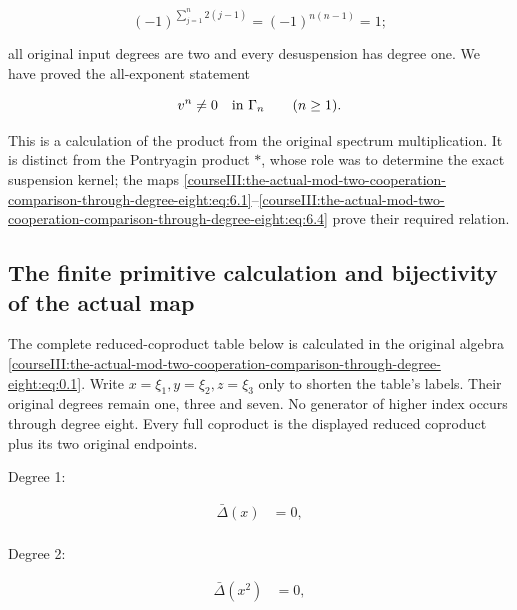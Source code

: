 \begin{equation}
(-1)^{\sum_{j=1}^n2(j-1)}=(-1)^{n(n-1)}=1;
\label{courseIII:the-actual-mod-two-cooperation-comparison-through-degree-eight:eq:6.4}
\end{equation}

all original input degrees are two and every desuspension has degree one. We have proved the all-exponent statement

\begin{equation}
v^n\neq0\quad\hbox{in }\Gamma_n\qquad(n\geq1).
\label{courseIII:the-actual-mod-two-cooperation-comparison-through-degree-eight:eq:6.5}
\end{equation}

This is a calculation of the product from the original spectrum multiplication. It is distinct from the Pontryagin product \(\ast\), whose role was to determine the exact suspension kernel; the maps \eqref{courseIII:the-actual-mod-two-cooperation-comparison-through-degree-eight:eq:6.1}--\eqref{courseIII:the-actual-mod-two-cooperation-comparison-through-degree-eight:eq:6.4} prove their required relation.

\subsection{The finite primitive calculation and bijectivity of the actual map}
\label{courseIII:the-actual-mod-two-cooperation-comparison-through-degree-eight:actual-eight-bijectivity}

\label{courseIII:the-actual-mod-two-cooperation-comparison-through-degree-eight:section-7}\label{courseIII:actual-degree8:7}

The complete reduced-coproduct table below is calculated in the original algebra \eqref{courseIII:the-actual-mod-two-cooperation-comparison-through-degree-eight:eq:0.1}. Write \(x=\xi_1,y=\xi_2,z=\xi_3\) only to shorten the table's labels. Their original degrees remain one, three and seven. No generator of higher index occurs through degree eight. Every full coproduct is the displayed reduced coproduct plus its two original endpoints.

Degree 1:

\[
\begin{aligned}
\bar\Delta(x)&=0,\\
\end{aligned}
\]

Degree 2:

\[
\begin{aligned}
\bar\Delta(x^{2})&=0,\\
\end{aligned}
\]

